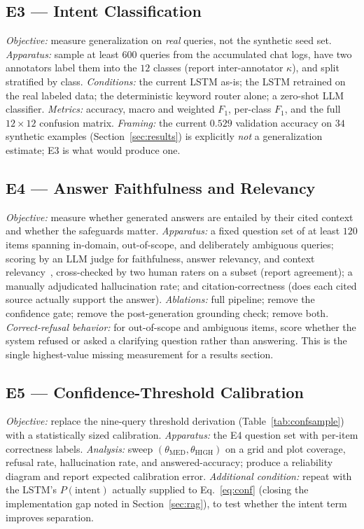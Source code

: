 \subsection{E3 --- Intent Classification}
\emph{Objective:} measure generalization on \emph{real} queries, not the
synthetic seed set. \emph{Apparatus:} sample at least $600$ queries from
the accumulated chat logs, have two annotators label them into the $12$
classes (report inter-annotator $\kappa$), and split stratified by class.
\emph{Conditions:} the current LSTM as-is; the LSTM retrained on the real
labeled data; the deterministic keyword router alone; a zero-shot LLM
classifier. \emph{Metrics:} accuracy, macro and weighted $F_1$, per-class
$F_1$, and the full $12{\times}12$ confusion matrix. \emph{Framing:} the
current $0.529$ validation accuracy on $34$ synthetic examples
(Section~\ref{sec:results}) is explicitly \emph{not} a generalization
estimate; E3 is what would produce one.

\subsection{E4 --- Answer Faithfulness and Relevancy}
\emph{Objective:} measure whether generated answers are entailed by their
cited context and whether the safeguards matter. \emph{Apparatus:} a fixed
question set of at least $120$ items spanning in-domain, out-of-scope, and
deliberately ambiguous queries; scoring by an LLM judge for faithfulness,
answer relevancy, and context relevancy~\cite{es2024ragas}, cross-checked
by two human raters on a subset (report agreement); a manually adjudicated
hallucination rate; and citation-correctness (does each cited source
actually support the answer). \emph{Ablations:} full pipeline; remove the
confidence gate; remove the post-generation grounding check; remove both.
\emph{Correct-refusal behavior:} for out-of-scope and ambiguous items,
score whether the system refused or asked a clarifying question rather than
answering. This is the single highest-value missing measurement for a
results section.

\subsection{E5 --- Confidence-Threshold Calibration}
\emph{Objective:} replace the nine-query threshold derivation
(Table~\ref{tab:confsample}) with a statistically sized calibration.
\emph{Apparatus:} the E4 question set with per-item correctness labels.
\emph{Analysis:} sweep $(\theta_{\text{MED}}, \theta_{\text{HIGH}})$ on a
grid and plot coverage, refusal rate, hallucination rate, and
answered-accuracy; produce a reliability diagram and report expected
calibration error. \emph{Additional condition:} repeat with the LSTM's
$P(\text{intent})$ actually supplied to Eq.~\eqref{eq:conf} (closing the
implementation gap noted in Section~\ref{sec:rag}), to test whether the
intent term improves separation.

